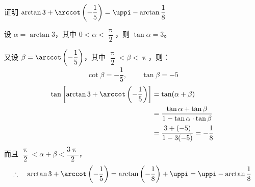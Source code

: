 \begin{example}
  证明 $\arctan 3+\arccot\left(-\dfrac{1}{5}\right)=\uppi-\arctan\dfrac{1}{8}$
\end{example}

\begin{solution}
设 $\alpha=\arctan 3$，其中 $0<\alpha<\dfrac{\uppi}{2}$，则 $\tan\alpha=3$。

又设 $\beta=\arccot\left(-\dfrac{1}{5}\right)$，其中 $\dfrac{\uppi}{2}<\beta<\uppi$，则：
\[\cot\beta=-\dfrac{1}{5},\qquad \tan\beta=-5\]
\[\begin{split}
 \tan\left[\arctan 3+\arccot\left(-\frac{1}{5}\right)\right]
&=\tan(\alpha+\beta)\\
&=\frac{\tan\alpha+\tan\beta}{1-\tan\alpha\cdot \tan\beta}\\
&=\frac{3+(-5)}{1-3(-5)}=-\frac{1}{8}
\end{split}\]
而且 $\dfrac{\uppi}{2}<\alpha+\beta<\dfrac{3\uppi}{2}$，
\[\therefore\quad \arctan 3+\arccot\left(-\frac{1}{5}\right)=\arctan\left(-\frac{1}{8}\right)+\uppi=\uppi-\arctan\frac{1}{8}\]
\end{solution}

